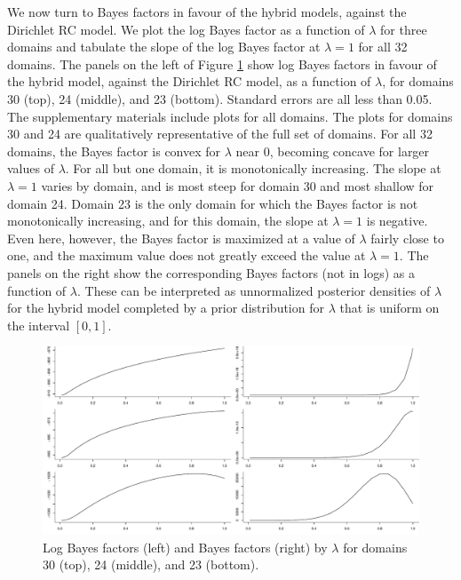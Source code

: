 \documentclass[11pt,letter]{article}
\newcommand{\DP}{Dirichlet RC model}
\begin{document}
We now turn to Bayes factors in favour of the hybrid models, against the \DP{}.
We plot the log Bayes factor as a function of $\lambda$ for three domains and tabulate the slope of the log Bayes factor at $\lambda = 1$ for all 32 domains.
The panels on the left of Figure \ref{f:BF_by_lambda} show log Bayes factors in favour of the hybrid model, against the \DP{}, as a function of $\lambda$, for domains 30 (top), 24 (middle), and 23 (bottom).
Standard errors are all less than 0.05.
The supplementary materials include plots for all domains.
The plots for domains 30 and 24 are qualitatively representative of the full set of domains.
For all 32 domains, the Bayes factor is convex for $\lambda$ near 0, becoming concave for larger values of $\lambda$.
For all but one domain, it is monotonically increasing.
The slope at $\lambda = 1$ varies by domain, and is most steep for domain 30 and most shallow for domain 24.
Domain 23 is the only domain for which the Bayes factor is not monotonically increasing, and for this domain, the slope at $\lambda = 1$ is negative.
Even here, however, the Bayes factor is maximized at a value of $\lambda$ fairly close to one, and the maximum value does not greatly exceed the value at $\lambda = 1$.
The panels on the right show the corresponding Bayes factors (not in logs) as a function of $\lambda$.
These can be interpreted as unnormalized posterior densities of $\lambda$ for the hybrid model completed by a prior distribution for $\lambda$ that is uniform on the interval $[0,1]$.

\begin{figure}
  \centering
  \includegraphics[width=\textwidth]{figures/BF_by_lambda.pdf}
  \caption{Log Bayes factors (left) and Bayes factors (right) by $\lambda$ for domains 30 (top), 24 (middle), and 23 (bottom).}
  \label{f:BF_by_lambda}
\end{figure}
\end{document}
